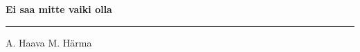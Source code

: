 \documentclass[10pt]{book}
\begin{document}
{
  \samepage
  \raggedbottom
  \raggedright
  \sloppy


  \vspace{0.2in}

  \noindent\begin{minipage}{.1\textwidth}
    \hfill\vspace{0.1in}
  \end{minipage}%
  \noindent\begin{minipage}{.8\textwidth}
    \centering
    \bfseries
    \large Ei saa mitte vaiki olla
  \end{minipage}%
  \noindent\begin{minipage}{.1\textwidth}
      \hfill\vspace{0.1in}
  \end{minipage}

  \nopagebreak[4]
  \vspace{0.1in}
  \nopagebreak[4]
  \hrule height 0.05ex
  \nopagebreak[4]
  \vspace{-0.05in}

  {\footnotesize A. Haava \hfill M. H\"arma }\\
  \vspace{0.01in}



}
\end{document}
